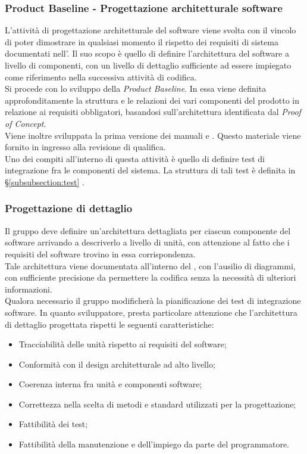 \subsubsection{Product Baseline - Progettazione architetturale software}
L'attività di progettazione architetturale del software viene svolta con il vincolo di poter dimostrare in qualsiasi momento il rispetto dei requisiti di sistema documentati nell'\docNameVersionAdR{}. Il suo scopo è quello di definire l'architettura del software a livello di componenti, con un livello di dettaglio sufficiente ad essere impiegato come riferimento nella successiva attività di codifica.\\
Si procede con lo sviluppo della \textit{Product Baseline}. In essa viene definita approfonditamente la struttura e le relazioni dei vari componenti del prodotto in relazione ai requisiti obbligatori, basandosi sull'architettura identificata dal \textit{Proof of Concept}.\\
Viene inoltre sviluppata la prima versione dei manuali \docNameMU{} e \docNameMS{}. Questo materiale viene fornito in ingresso alla revisione di qualifica.\\
Uno dei compiti all'interno di questa attività è quello di definire test di integrazione fra le componenti del sistema. La struttura di tali test è definita in §\ref{subsubsection:test} .

\subsubsection{Progettazione di dettaglio} \label{subsubsection:progettazione_dettaglio}
Il gruppo deve definire un'architettura dettagliata per ciascun componente del software arrivando a descriverlo a livello di unità, con attenzione al fatto che i requisiti del software trovino in essa corrispondenza.\\
Tale architettura viene documentata all'interno del \docNameVersionMS{}, con l'ausilio di diagrammi, con sufficiente precisione da permettere la codifica senza la necessità di ulteriori informazioni.\\
Qualora necessario il gruppo modificherà la pianificazione dei test di integrazione software.
In quanto sviluppatore, \groupName{} presta particolare attenzione che l'architettura di dettaglio progettata rispetti le seguenti caratteristiche:
\begin{itemize}
	\item Tracciabilità delle unità rispetto ai requisiti del software;
	\item Conformità con il design architetturale ad alto livello;
	\item Coerenza interna fra unità e componenti software;
	\item Correttezza nella scelta di metodi e standard utilizzati per la progettazione;
	\item Fattibilità dei test;
	\item Fattibilità della manutenzione e dell'impiego da parte del programmatore.
\end{itemize}

